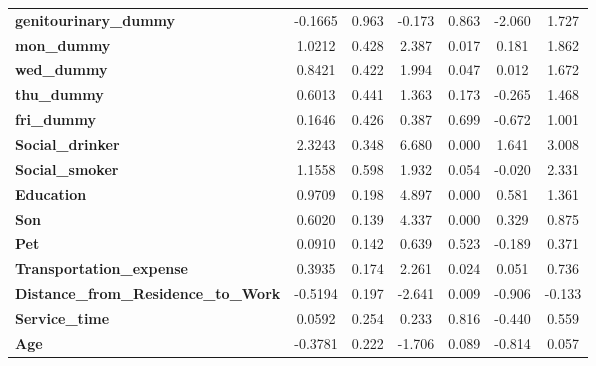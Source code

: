 \documentclass{report}
\begin{document}
\begin{center}
\begin{tabular}{lcccccc}
\textbf{genitourinary\_dummy}                &      -0.1665  &        0.963     &    -0.173  &         0.863        &       -2.060    &        1.727     \\
\textbf{mon\_dummy}                          &       1.0212  &        0.428     &     2.387  &         0.017        &        0.181    &        1.862     \\
\textbf{wed\_dummy}                          &       0.8421  &        0.422     &     1.994  &         0.047        &        0.012    &        1.672     \\
\textbf{thu\_dummy}                          &       0.6013  &        0.441     &     1.363  &         0.173        &       -0.265    &        1.468     \\
\textbf{fri\_dummy}                          &       0.1646  &        0.426     &     0.387  &         0.699        &       -0.672    &        1.001     \\
\textbf{Social\_drinker}                     &       2.3243  &        0.348     &     6.680  &         0.000        &        1.641    &        3.008     \\
\textbf{Social\_smoker}                      &       1.1558  &        0.598     &     1.932  &         0.054        &       -0.020    &        2.331     \\
\textbf{Education}                           &       0.9709  &        0.198     &     4.897  &         0.000        &        0.581    &        1.361     \\
\textbf{Son}                                 &       0.6020  &        0.139     &     4.337  &         0.000        &        0.329    &        0.875     \\
\textbf{Pet}                                 &       0.0910  &        0.142     &     0.639  &         0.523        &       -0.189    &        0.371     \\
\textbf{Transportation\_expense}             &       0.3935  &        0.174     &     2.261  &         0.024        &        0.051    &        0.736     \\
\textbf{Distance\_from\_Residence\_to\_Work} &      -0.5194  &        0.197     &    -2.641  &         0.009        &       -0.906    &       -0.133     \\
\textbf{Service\_time}                       &       0.0592  &        0.254     &     0.233  &         0.816        &       -0.440    &        0.559     \\
\textbf{Age}                                 &      -0.3781  &        0.222     &    -1.706  &         0.089        &       -0.814    &        0.057     \\

\end{tabular}
\end{center}
\end{document}
